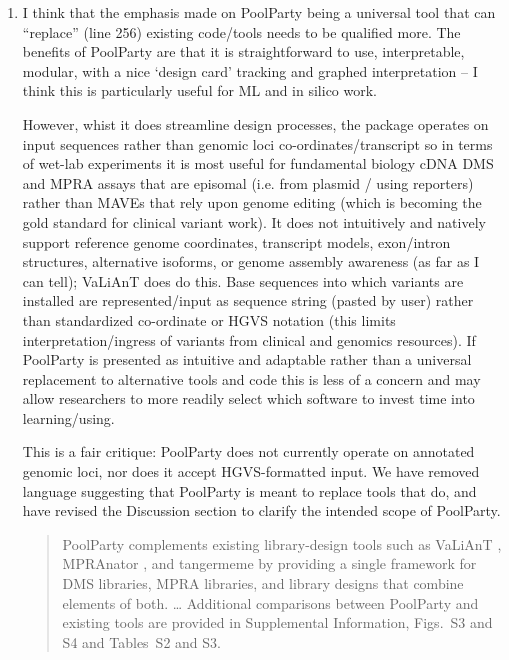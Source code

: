 \documentclass[11pt]{article}
\newenvironment{response}{\par\color{responseblue}}{\par}
\newenvironment{msquote}
  {\begin{quote}\color{quotedtext}\noindent\ignorespaces}
  {\end{quote}}
\begin{document}
\begin{enumerate}
\item I think that the emphasis made on PoolParty being a universal tool that
can ``replace'' (line 256) existing code/tools needs to be qualified more. The
benefits of PoolParty are that it is straightforward to use, interpretable,
modular, with a nice `design card' tracking and graphed interpretation -- I
think this is particularly useful for ML and in silico work.

However, whist it does streamline design processes, the package operates on
input sequences rather than genomic loci co-ordinates/transcript so in terms of
wet-lab experiments it is most useful for fundamental biology cDNA DMS and MPRA
assays that are episomal (i.e. from plasmid / using reporters) rather than MAVEs
that rely upon genome editing (which is becoming the gold standard for clinical
variant work). It does not intuitively and natively support reference genome
coordinates, transcript models, exon/intron structures, alternative isoforms,
or genome assembly awareness (as far as I can tell); VaLiAnT does do this. Base
sequences into which variants are installed are represented/input as sequence
string (pasted by user) rather than standardized co-ordinate or HGVS notation
(this limits interpretation/ingress of variants from clinical and genomics
resources). If PoolParty is presented as intuitive and adaptable rather than a
universal replacement to alternative tools and code this is less of a concern
and may allow researchers to more readily select which software to invest time
into learning/using.

\begin{response}
This is a fair critique: PoolParty does not currently operate on annotated genomic loci, nor does it accept HGVS-formatted input. We have removed language suggesting that PoolParty is meant to replace tools that do, and have revised the Discussion section to clarify the intended scope of PoolParty. 
\begin{msquote}
  PoolParty complements existing library-design tools such as VaLiAnT \citep{Barbon2022th}, MPRAnator \citep{GeorgakopoulosSoares2017gb}, and tangermeme \citep{Schreiber2025nd} by providing a single framework for DMS libraries, MPRA libraries, and library designs that combine elements of both. \ldots{} Additional comparisons between PoolParty and existing tools are provided in Supplemental Information, Figs.~S3 and S4 and Tables~S2 and S3.


\end{msquote}
\end{response}
\end{enumerate}
\end{document}
